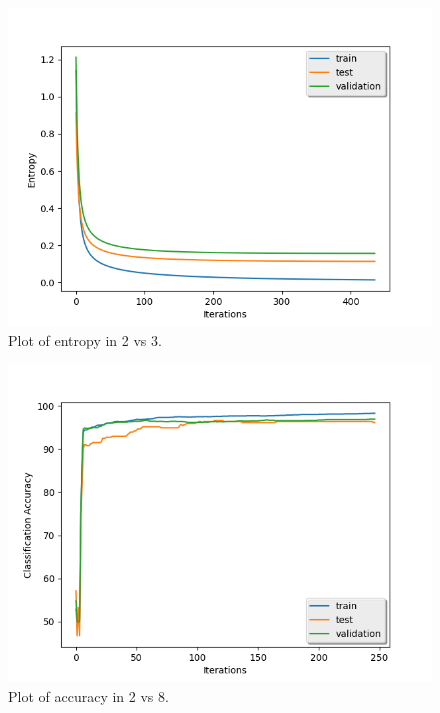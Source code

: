 \documentclass{article} %
\begin{document}
\begin{figure}[h]
\begin{center}
\includegraphics[width=0.8\linewidth]{plt_2vs3_losses.png}
\end{center}
\caption{Plot of entropy in 2 vs 3.}
\end{figure}

\begin{figure}[h]
\begin{center}
\includegraphics[width=0.8\linewidth]{plt_2vs8_accuracy.png}
\end{center}
\caption{Plot of accuracy in 2 vs 8.}
\end{figure}
\end{document}
